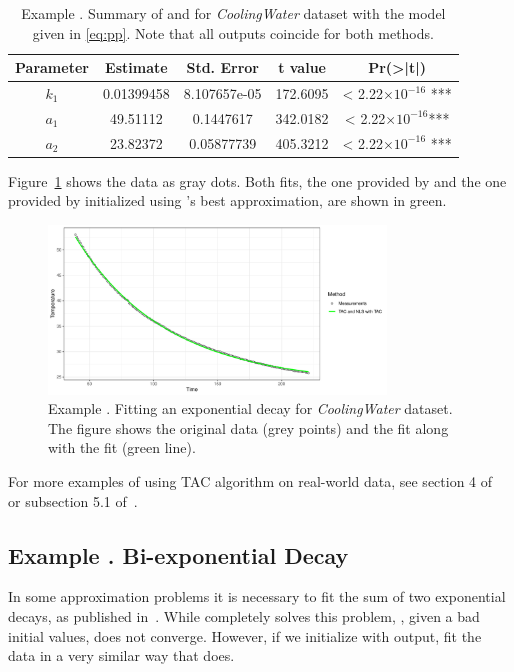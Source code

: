  
\begin{table}[htb]
\centering
\begin{tabular}{ccccc}
\toprule
Parameter &  Estimate & Std. Error & t value & Pr(>|t|)\\   
\midrule
$k_1$ & 0.01399458 & 8.107657e-05 & 172.6095 & < 2.22$\times 10^{-16}$ ***\\
$a_1$ & 49.51112 & 0.1447617 & 342.0182 & < 2.22$\times 10^{-16}$***\\
$a_2$ & 23.82372 & 0.05877739 & 405.3212 & < 2.22$\times 10^{-16}$ ***\\
\bottomrule
\end{tabular} 
\caption{Example . Summary of  and  for \textit{CoolingWater} dataset with the model given in \eqref{eq:pp}. Note that all outputs coincide for both methods.}
\label{t:one_exponential_summaries}
\end{table}

Figure~\ref{fig:one_exponential} shows the data as gray dots. Both fits, the one provided by  and the one provided by  initialized using 's best approximation, are shown in green.  

\begin{figure}[htb]
\centering
\includegraphics[width=0.8\textwidth]{example1.pdf}
\caption{Example . Fitting an exponential decay for \textit{CoolingWater} dataset. The figure shows the original data (grey points) and the  fit along with the  fit (green line).}
\label{fig:one_exponential}
\end{figure}

For more examples of using TAC algorithm on real-world data, see section 4 of~\citet{tac} or subsection 5.1 of~\citet{tac_mdpi}.


 
\addtocounter{n}{1}
\subsection{Example . Bi-exponential Decay}  \label{ss_two_exp}
In some approximation problems it is necessary to fit the sum of two exponential decays, as published in~\citet{beniteztoca2010}. While  completely solves this problem, , given a bad initial values, does not converge. However, if we initialize  with  output,  fit the data in a very similar way that  does.

